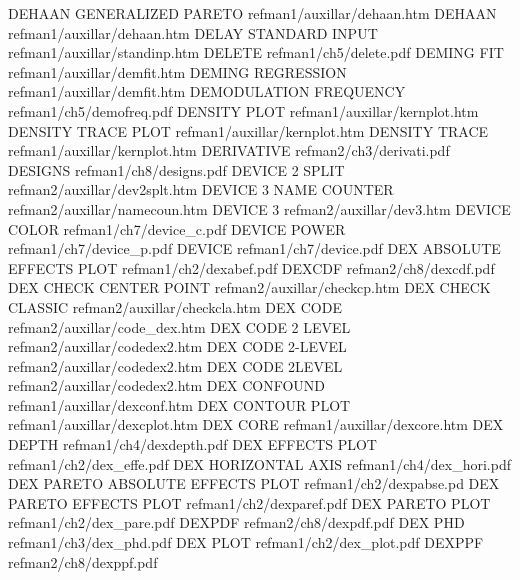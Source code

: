 DEHAAN GENERALIZED PARETO               refman1/auxillar/dehaan.htm
DEHAAN                                  refman1/auxillar/dehaan.htm
DELAY STANDARD INPUT                    refman1/auxillar/standinp.htm
DELETE                                  refman1/ch5/delete.pdf
DEMING FIT                              refman1/auxillar/demfit.htm
DEMING REGRESSION                       refman1/auxillar/demfit.htm
DEMODULATION FREQUENCY                  refman1/ch5/demofreq.pdf
DENSITY PLOT                            refman1/auxillar/kernplot.htm
DENSITY TRACE PLOT                      refman1/auxillar/kernplot.htm
DENSITY TRACE                           refman1/auxillar/kernplot.htm
DERIVATIVE                              refman2/ch3/derivati.pdf
DESIGNS                                 refman1/ch8/designs.pdf
DEVICE 2 SPLIT                          refman2/auxillar/dev2splt.htm
DEVICE 3 NAME COUNTER                   refman2/auxillar/namecoun.htm
DEVICE 3                                refman2/auxillar/dev3.htm
DEVICE COLOR                            refman1/ch7/device_c.pdf
DEVICE POWER                            refman1/ch7/device_p.pdf
DEVICE                                  refman1/ch7/device.pdf
DEX ABSOLUTE EFFECTS PLOT               refman1/ch2/dexabef.pdf
DEXCDF                                  refman2/ch8/dexcdf.pdf
DEX CHECK CENTER POINT                  refman2/auxillar/checkcp.htm
DEX CHECK CLASSIC                       refman2/auxillar/checkcla.htm
DEX CODE                                refman2/auxillar/code_dex.htm
DEX CODE 2 LEVEL                        refman2/auxillar/codedex2.htm
DEX CODE 2-LEVEL                        refman2/auxillar/codedex2.htm
DEX CODE 2LEVEL                         refman2/auxillar/codedex2.htm
DEX CONFOUND                            refman1/auxillar/dexconf.htm
DEX CONTOUR PLOT                        refman1/auxillar/dexcplot.htm
DEX CORE                                refman1/auxillar/dexcore.htm
DEX DEPTH                               refman1/ch4/dexdepth.pdf
DEX EFFECTS PLOT                        refman1/ch2/dex_effe.pdf
DEX HORIZONTAL AXIS                     refman1/ch4/dex_hori.pdf
DEX PARETO ABSOLUTE EFFECTS PLOT        refman1/ch2/dexpabse.pd
DEX PARETO EFFECTS PLOT                 refman1/ch2/dexparef.pdf
DEX PARETO PLOT                         refman1/ch2/dex_pare.pdf
DEXPDF                                  refman2/ch8/dexpdf.pdf
DEX PHD                                 refman1/ch3/dex_phd.pdf
DEX PLOT                                refman1/ch2/dex_plot.pdf
DEXPPF                                  refman2/ch8/dexppf.pdf
